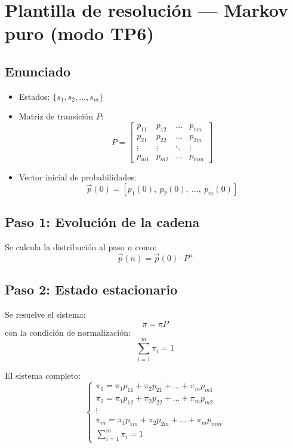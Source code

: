 \documentclass{article}
\begin{document}
\section*{Plantilla de resoluci\'on --- Markov puro (modo TP6)}

\subsection*{Enunciado}

\begin{itemize}
  \item Estados: $\{ s_1, s_2, \dots, s_m \}$
  \item Matriz de transici\'on $P$:
  \[
  P =
  \begin{bmatrix}
  p_{11} & p_{12} & \dots & p_{1m} \\
  p_{21} & p_{22} & \dots & p_{2m} \\
  \vdots & \vdots & \ddots & \vdots \\
  p_{m1} & p_{m2} & \dots & p_{mm}
  \end{bmatrix}
  \]
  \item Vector inicial de probabilidades:
  \[
  \vec{p}(0) = \left[ p_1(0),\ p_2(0),\ \dots,\ p_m(0) \right]
  \]
\end{itemize}

\subsection*{Paso 1: Evoluci\'on de la cadena}

Se calcula la distribuci\'on al paso $n$ como:
\[
\vec{p}(n) = \vec{p}(0) \cdot P^n
\]

\subsection*{Paso 2: Estado estacionario}

Se resuelve el sistema:
\[
\pi = \pi P
\]
con la condici\'on de normalizaci\'on:
\[
\sum_{i=1}^{m} \pi_i = 1
\]

El sistema completo:
\[
\begin{cases}
\pi_1 = \pi_1 p_{11} + \pi_2 p_{21} + \dots + \pi_m p_{m1} \\
\pi_2 = \pi_1 p_{12} + \pi_2 p_{22} + \dots + \pi_m p_{m2} \\
\vdots \\
\pi_m = \pi_1 p_{1m} + \pi_2 p_{2m} + \dots + \pi_m p_{mm} \\
\sum_{i=1}^m \pi_i = 1
\end{cases}
\]
\end{document}
